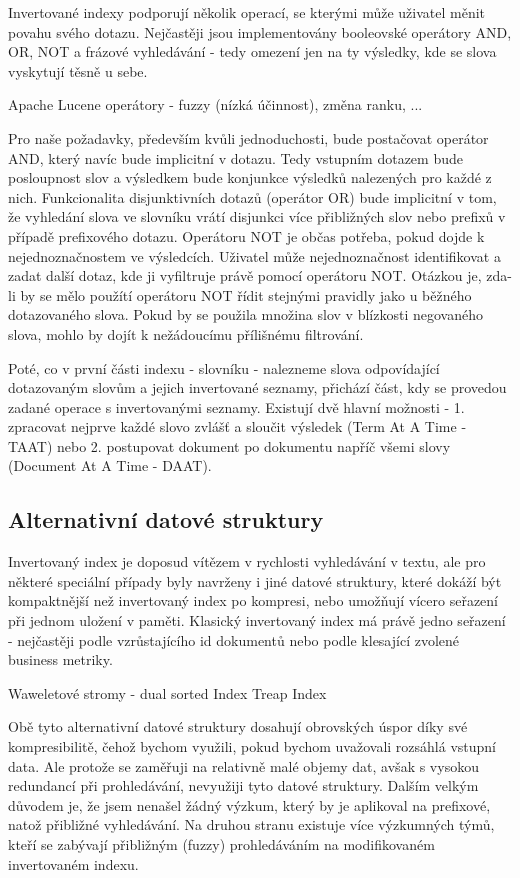 \documentclass[11pt]{article}
\begin{document}
Invertované indexy podporují několik operací, se kterými může uživatel měnit
povahu svého dotazu. Nejčastěji jsou implementovány booleovské operátory AND,
OR, NOT a frázové vyhledávání - tedy omezení jen na ty výsledky, kde se slova
vyskytují těsně u sebe.

Apache Lucene operátory - fuzzy (nízká účinnost), změna ranku, ...

Pro naše požadavky, především kvůli jednoduchosti, bude postačovat operátor
AND, který navíc bude implicitní v dotazu. Tedy vstupním dotazem bude
posloupnost slov a výsledkem bude konjunkce výsledků nalezených pro každé z
nich. Funkcionalita disjunktivních dotazů (operátor OR) bude implicitní v tom,
že vyhledání slova ve slovníku vrátí disjunkci více přibližných slov nebo
prefixů v případě prefixového dotazu.  Operátoru NOT je občas potřeba, pokud
dojde k nejednoznačnostem ve výsledcích.  Uživatel může nejednoznačnost
identifikovat a zadat další dotaz, kde ji vyfiltruje právě pomocí operátoru
NOT. Otázkou je, zda-li by se mělo použítí operátoru NOT řídit stejnými
pravidly jako u běžného dotazovaného slova. Pokud by se použila množina slov v
blízkosti negovaného slova, mohlo by dojít k nežádoucímu přílišnému filtrování.

Poté, co v první části indexu - slovníku - nalezneme slova odpovídající
dotazovaným slovům a jejich invertované seznamy, přichází část, kdy se provedou
zadané operace s invertovanými seznamy.  Existují dvě hlavní možnosti - 1.
zpracovat nejprve každé slovo zvlášť a sloučit výsledek (Term At A Time - TAAT)
nebo 2. postupovat dokument po dokumentu napříč všemi slovy (Document At A Time
- DAAT).

\subsection{Alternativní datové struktury}
Invertovaný index je doposud vítězem v rychlosti vyhledávání v textu, ale pro
některé speciální případy byly navrženy i jiné datové struktury, které dokáží
být kompaktnější než invertovaný index po kompresi, nebo umožňují vícero
seřazení při jednom uložení v paměti. Klasický invertovaný index má právě jedno
seřazení - nejčastěji podle vzrůstajícího id dokumentů nebo podle klesající
zvolené business metriky.

Waweletové stromy - dual sorted Index
Treap Index

Obě tyto alternativní datové struktury dosahují obrovských úspor díky své
kompresibilitě, čehož bychom využili, pokud bychom uvažovali rozsáhlá vstupní
data. Ale protože se zaměřuji na relativně malé objemy dat, avšak s vysokou
redundancí při prohledávání, nevyužiji tyto datové struktury. Dalším velkým
důvodem je, že jsem nenašel žádný výzkum, který by je aplikoval na prefixové,
natož přibližné vyhledávání. Na druhou stranu existuje více výzkumných týmů,
kteří se zabývají přibližným (fuzzy) prohledáváním na modifikovaném invertovaném
indexu.
\end{document}
